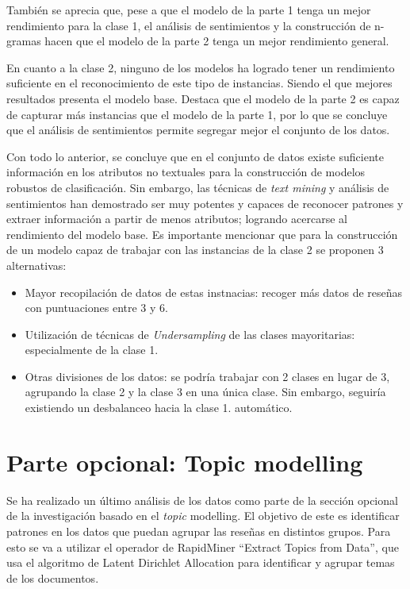 \documentclass[es]{uc3mreport}
\begin{document}
\begin{report}
También se aprecia que, pese a que el modelo de la parte 1 tenga un mejor
rendimiento para la clase 1, el análisis de sentimientos y la construcción de
n-gramas hacen que el modelo de la parte 2 tenga un mejor rendimiento general.

En cuanto a la clase 2, ninguno de los modelos ha logrado tener un rendimiento
suficiente en el reconocimiento de este tipo de instancias. Siendo el que
mejores resultados presenta el modelo base. Destaca que el modelo de la parte 2
es capaz de capturar más instancias que el modelo de la parte 1, por lo que se
concluye que el análisis de sentimientos permite segregar mejor el conjunto de
los datos.

Con todo lo anterior, se concluye que en el conjunto de datos existe suficiente
información en los atributos no textuales para la construcción de modelos
robustos de clasificación. Sin embargo, las técnicas de \textit{text mining} y
análisis de sentimientos han demostrado ser muy potentes y capaces de reconocer
patrones y extraer información a partir de menos atributos; logrando acercarse
al rendimiento del modelo base. Es importante mencionar que para la construcción
de un modelo capaz de trabajar con las instancias de la clase 2 se proponen 3
alternativas:

\begin{itemize}
    \item Mayor recopilación de datos de estas instnacias: recoger más datos de
    reseñas con puntuaciones entre 3 y 6.
    \item Utilización de técnicas de \textit{Undersampling} de las clases
    mayoritarias: especialmente de la clase 1.
    \item Otras divisiones de los datos: se podría trabajar con 2 clases en
    lugar de 3, agrupando la clase 2 y la clase 3 en una única clase. Sin
    embargo, seguiría existiendo un desbalanceo hacia la clase 1.
    automático.
\end{itemize}

\section{Parte opcional: Topic modelling}
\label{chap:topic}

Se ha realizado un último análisis de los datos como parte de la sección
opcional de la investigación basado en el \textit{topic} modelling. El objetivo de este
es identificar patrones en los datos que puedan agrupar las reseñas en
distintos grupos. Para esto se va a utilizar el operador de RapidMiner “Extract
Topics from Data”, que usa el algoritmo de Latent Dirichlet Allocation para
identificar y agrupar temas de los documentos.


\end{report}
\end{document}
